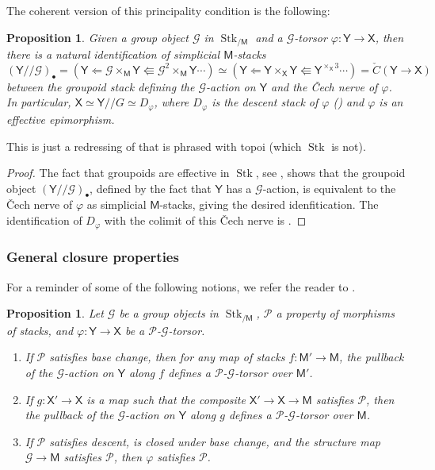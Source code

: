 \documentclass[11pt, a4paper]{article}
\newcommand{\1}{\mathbf{1}}
\DeclareMathOperator{\Stk}{Stk}
\newcommand{\Cech}{{\check{C}}}
\newcommand{\calG}{\mathcal{G}}
\newcommand{\M}{\mathsf{M}}
\newcommand{\calP}{\mathcal{P}}
\newcommand{\X}{\mathsf{X}}
\newcommand{\Y}{\mathsf{Y}}
\theoremstyle{plain}
\newtheorem{prop}[equation]{Proposition}
\theoremstyle{definition}
\theoremstyle{remark}\numberwithin{equation}{section}
\begin{document}
The coherent version of this principality condition is the following:

\begin{prop}\label{pr:higher_principality}
    Given a group object $\calG$ in $\Stk_{/\M}$ and a $\calG$-torsor $\varphi\colon \Y \to \X$, then there is a natural identification of simplicial $\M$-stacks
\[(\Y//\calG)_\bullet = \left(\Y \Leftarrow \calG \times_\M \Y \Lleftarrow \calG^2 \times_\M \Y \cdots\right) \simeq \left(\Y \Leftarrow \Y \times_\X \Y \Lleftarrow \Y^{\times_\X 3} \cdots\right) = \Cech(\Y \to \X)\]
    between the groupoid stack defining the $\calG$-action on $\Y$ and the Čech nerve of $\varphi$. In particular, $\X \simeq \Y // G \simeq D_\varphi$, where $D_\varphi$ is the \emph{descent stack of $\varphi$} (\cite[Df.2.3.1.1]{reconstruction}) and $\varphi$ is an effective epimorphism.
\end{prop}

This is just a redressing of \cite[Pr.3.7]{nikolaus_schreiber_stevenson_general_theory} that is phrased with topoi (which $\Stk$ is not).

\begin{proof}
    The fact that groupoids are effective in $\Stk$, see \cite[Pr.2.1.2.9(3)]{reconstruction}, shows that the groupoid object $(\Y//\calG)_\bullet$, defined by the fact that $\Y$ has a $\calG$-action, is equivalent to the Čech nerve of $\varphi$ as simplicial $\M$-stacks, giving the desired idenfitication. The identification of $D_\varphi$ with the colimit of this Čech nerve is \cite[Lm.2.3.1.2]{reconstruction}.
\end{proof}

\subsubsection{General closure properties}\label{sssec:closureproperties}
For a reminder of some of the following notions, we refer the reader to .

\begin{prop}\label{pr:G-torsors_and_basechange}
    Let $\calG$ be a group objects in $\Stk_{/\M}$, $\calP$ a property of morphisms of stacks, and $\varphi \colon \Y \to \X$ be a $\calP$-$\calG$-torsor.
    \begin{enumerate}
        \item If $\calP$ satisfies base change, then for any map of stacks $f\colon \M' \to \M$, the pullback of the $\calG$-action on $\Y$ along $f$ defines a $\calP$-$\calG$-torsor over $\M'$.
        \item If $g\colon \X' \to \X$ is a map such that the composite $\X' \to \X \to \M$ satisfies $\calP$, then the pullback of the $\calG$-action on $\Y$ along $g$ defines a $\calP$-$\calG$-torsor over $\M$.
        \item If $\calP$ satisfies descent, is closed under base change, and the structure map $\calG \to \M$ satisfies $\calP$, then $\varphi$ satisfies $\calP$.
    \end{enumerate}
\end{prop}
\end{document}
